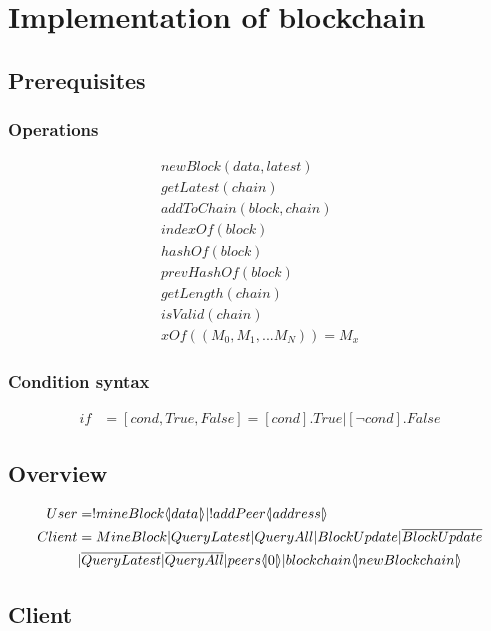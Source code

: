 \section{Implementation of blockchain}

\subsection{Prerequisites}

\subsubsection{Operations}

\begin{align*}
    newBlock(data,latest)\\
    getLatest(chain)\\
    addToChain(block,chain)\\
    indexOf(block)\\
    hashOf(block)\\
    prevHashOf(block)\\
    getLength(chain)\\
    isValid(chain)\\
    xOf((M_0,M_1,...M_N))=M_x
\end{align*}

\subsubsection{Condition syntax}

\begin{align*}
    if &= [cond,True,False] = [cond].True|[\neg cond].False
\end{align*}

\subsection{Overview}

\begin{align*}
    User &= !mineBlock \lift{}{data} |!addPeer\lift{}{address}\\
    Client &= MineBlock|QueryLatest|QueryAll|BlockUpdate|\overline{BlockUpdate}\\
    &|\overline{QueryLatest}|\overline{QueryAll}|peers\lift{}{0}|blockchain\lift{}{newBlockchain}
\end{align*}

\subsection{Client}

